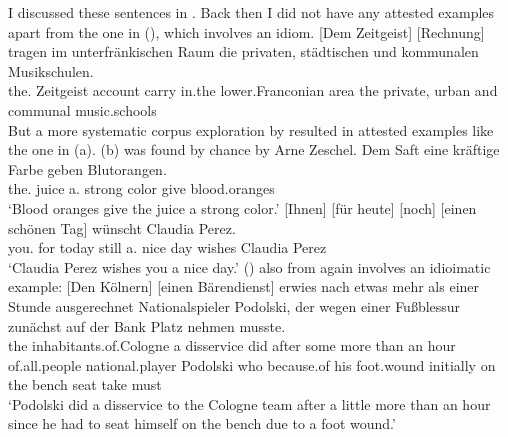 I discussed these sentences in . Back then I did not have any attested
examples apart from the one in (), which involves an idiom. 
\ea
\label{bsp-zeitgeist} 
\gll {}[Dem Zeitgeist] [Rechnung] tragen im unterfränkischen Raum die privaten, städtischen und kommunalen Musikschulen.\footnotemark\\
      \spacebr{}the.\dat{} Zeitgeist \spacebr{}account carry in.the lower.Franconian area the private, urban and communal music.schools\\
\z
But a more systematic corpus exploration by \citet{Bildhauer2011a} resulted in attested examples like the one in (a). (b) was
found by chance by Arne Zeschel.
\eal
\ex
\label{ex-dem-saft-eine-kraeftige-farbe}
\gll Dem Saft eine kräftige Farbe geben Blutorangen.\footnotemark\\
     the.\dat{} juice a.\acc{}   strong   color give blood.oranges\\
\glt `Blood oranges give the juice a strong color.'
\ex\label{bsp-ihnen-für-heute}
\gll {}[Ihnen] [für heute] [noch] [einen schönen Tag] wünscht Claudia Perez.\footnotemark\\
  \spacebr{}you.\dat{} \spacebr{}for today \spacebr{}still \spacebr{}a.\acc{} nice day wishes Claudia Perez\\
%
\glt `Claudia Perez wishes you a nice day.'
\zl
() also from  again involves an idioimatic example:
\ea
\gll {}[Den Kölnern] [einen Bärendienst] erwies nach etwas mehr als einer Stunde ausgerechnet Nationalspieler Podolski,
der wegen einer Fußblessur zunächst auf der Bank Platz nehmen musste.\footnotemark\\
       \spacebr{}the inhabitants.of.Cologne \spacebr{}a disservice did after some more than an
       hour of.all.people national.player Podolski who because.of his foot.wound initially on the bench
       seat take must\\
\glt `Podolski did a disservice to the Cologne team after a little more than an hour since he had to
seat himself on the bench due to a foot wound.'
\z

